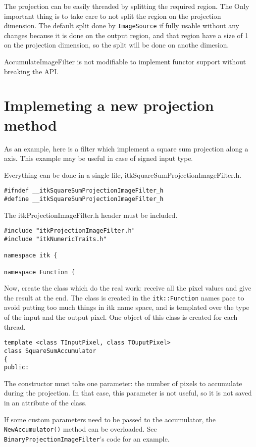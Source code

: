 \documentclass{InsightArticle}
\begin{document}
The projection can be easily threaded by splitting the required region. The
Only important thing is to take care to not split the region on the projection
dimension. 
The default split done by \verb$ImageSource$ if fully usable without any changes
because it is done on the output region, and that region have a size of 1 on
the projection dimension, so the split will be done on anothe dimesion.

AccumulateImageFilter is not modifiable to implement functor support without
breaking the API.

\section{Implemeting a new projection method}
As an example, here is a filter which implement a square sum projection along a
axis. This example may be useful in case of signed input type.

Everything can be done in a single file, itkSquareSumProjectionImageFilter.h.
\small \begin{verbatim}
#ifndef __itkSquareSumProjectionImageFilter_h
#define __itkSquareSumProjectionImageFilter_h
\end{verbatim} \normalsize
The itkProjectionImageFilter.h header must be included.
\small \begin{verbatim}
#include "itkProjectionImageFilter.h"
#include "itkNumericTraits.h"

namespace itk {

namespace Function {
\end{verbatim} \normalsize
Now, create the class which do the real work: receive all the pixel values and
give the result at the end. The class is created in the \verb$itk::Function$ names pace
to avoid putting too much things in itk name space, and is templated over the
type of the input and the output pixel.
One object of this class is created for each thread.
\small \begin{verbatim}
template <class TInputPixel, class TOuputPixel>
class SquareSumAccumulator
{
public:
\end{verbatim} \normalsize
The constructor must take one parameter: the number of pixels to accumulate
during the projection. In that case, this parameter is not useful, so it is not
saved in an attribute of the class.

If some custom parameters need to be passed to the accumulator, the \verb$NewAccumulator()$
method can be overloaded. See \verb$BinaryProjectionImageFilter$'s code for an
example.
\end{document}
